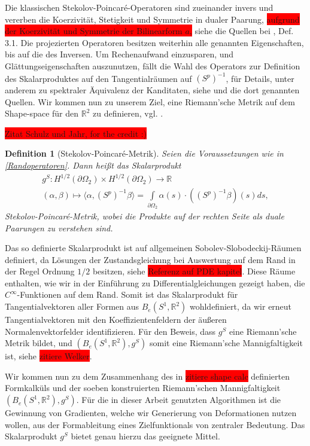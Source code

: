 \documentclass[bibliography=totoc,12pt,a4paper]{scrartcl}
\theoremstyle{exampstyle}
\newtheorem{defi}{Definition}%
\numberwithin{equation}{section}
\begin{document}
Die klassischen Stekolov-Poincaré-Operatoren sind zueinander invers und vererben die Koerzivität, Stetigkeit und Symmetrie in dualer Paarung, \colorbox{red}{aufgrund der Koerzivität und Symmetrie der Bilinearform $a$,} siehe die Quellen bei \cite{bfgs1}, Def. 3.1. Die projezierten Operatoren besitzen weiterhin alle genannten Eigenschaften, bis auf die des Inversen. Um Rechenaufwand einzusparen, und Glättungseigenschaften auszunutzen, fällt die Wahl des Operators zur Definition des Skalarproduktes auf den Tangentialräumen auf $(S^p)^{-1}$, für Details, unter anderem zu spektraler Äquivalenz der Kanditaten, siehe \cite{bfgs1} und die dort genannten Quellen. Wir kommen nun zu unserem Ziel, eine Riemann'sche Metrik auf dem Shape-space für den $\mathbb{R}^2$ zu definieren, vgl. \cite{bfgs1}.

\colorbox{red}{Zitat Schulz und Jahr, for the credit :)}

\begin{defi}[Stekolov-Poincaré-Metrik]\label{Stek-Poi-metrik}
Seien die Voraussetzungen wie in \ref{Randoperatoren}. Dann heißt das Skalarprodukt
\begin{align*}
	g^S: H^{1/2}(\partial \Omega_2) \times H^{1/2}(\partial \Omega_2) \rightarrow \mathbb{R} \\
	(\alpha,\beta) \mapsto \langle \alpha, (S^p)^{-1}\beta \rangle = \underset{\partial \Omega_2}{\int} \alpha(s)\cdot((S^p)^{-1}\beta)(s)ds,
\end{align*}
\textit{Stekolov-Poincaré-Metrik}, wobei die Produkte auf der rechten Seite als duale Paarungen zu verstehen sind. 
\end{defi}

Das so definierte Skalarprodukt ist auf allgemeinen Sobolev-Slobodeckij-Räumen definiert, da Lösungen der Zustandsgleichung bei Auswertung auf dem Rand in der Regel Ordnung $1/2$ besitzen, siehe \colorbox{red}{Referenz auf PDE kapitel}. Diese Räume enthalten, wie wir in der Einführung zu Differentialgleichungen gezeigt haben, die $C^\infty$-Funktionen auf dem Rand. Somit ist das Skalarprodukt für Tangentialvektoren aller Formen aus $B_e(S^1, \mathbb{R}^2)$ wohldefiniert, da wir erneut Tangentialvektoren mit den Koeffizientenfeldern der äußeren Normalenvektorfelder identifizieren. Für den Beweis, dass $g^S$ eine Riemann'sche Metrik bildet, und $(B_e(S^1,\mathbb{R}^2),g^S)$ somit eine Riemann'sche Mannigfaltigkeit ist, siehe \colorbox{red}{zitiere Welker}.

Wir kommen nun zu dem Zusammenhang des in \colorbox{red}{zitiere shape calc} definierten Formkalküls und der soeben konstruierten Riemann'schen Mannigfaltigkeit $(B_e(S^1,\mathbb{R}^2),g^S)$.
Für die in dieser Arbeit genutzten Algorithmen ist die Gewinnung von Gradienten, welche wir Generierung von Deformationen nutzen wollen, aus der Formableitung eines Zielfunktionals von zentraler Bedeutung. Das Skalarprodukt $g^S$ bietet genau hierzu das geeignete Mittel.
\end{document}
